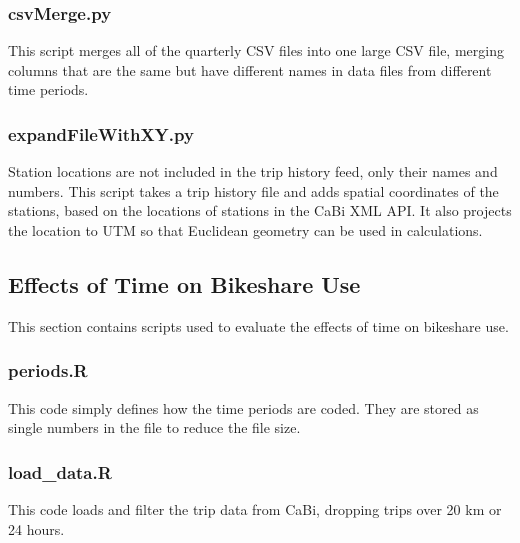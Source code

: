 \documentclass[letterpaper,11pt]{article}
\begin{document}


\subsubsection{csvMerge.py}
\label{csvMerge.py}

This script merges all of the quarterly CSV files into one large CSV
file, merging columns that are the same but have different names in
data files from different time periods.



\subsubsection{expandFileWithXY.py}
\label{expandFileWithXY.py}

Station locations are not included in the trip history feed, only
their names and numbers. This script takes a trip history file and
adds spatial coordinates of the stations, based on the locations of
stations in the CaBi XML API. It also projects the location to UTM so that
Euclidean geometry can be used in calculations.



\subsection{Effects of Time on Bikeshare Use}

This section contains scripts used to evaluate the effects of time on
bikeshare use.

\subsubsection{periods.R}
\label{periods.R}

This code simply defines how the time periods are coded. They are
stored as single numbers in the file to reduce the file size.



\subsubsection{load\_data.R}
\label{load_data.R}

This code loads and filter the trip data from CaBi, dropping trips
over 20 km or 24 hours.
\end{document}
